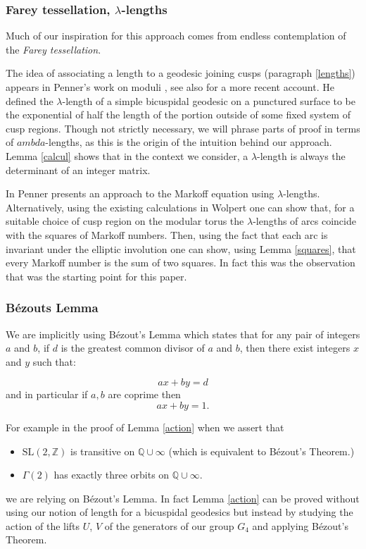 \documentclass[14pt,a4paper]{amsart}
\def\KK{G_4}
\def\ZZ{\mathbb{Z}}
\def\QQ{\mathbb{Q}}
\def\sl2{\mathrm{SL}(2, \ZZ)}
\def\g2{\Gamma(2)}
\begin{document}
 \subsubsection{Farey tessellation, $\lambda$-lengths}

 Much of our inspiration for this approach comes from  endless
 contemplation of the \textit{Farey tessellation}.
 
 The idea of associating a length to a geodesic joining cusps
 (paragraph \ref{lengths}) appears in Penner's work on moduli
 \cite{bob},
see also \cite{spring} for a more recent account.
He defined the $\lambda$-length of a simple bicuspidal geodesic 
on a punctured
surface to be the exponential of half the 
length of the portion outside of some fixed
system of cusp regions.
Though not strictly necessary,
we will phrase parts of proof in terms of $ambda$-lengths,
as this is the origin of the  intuition behind our approach. 
Lemma \ref{calcul} shows that in the context we consider,
a $\lambda$-length is always the determinant 
of an integer matrix.

In \cite{bob} Penner presents an approach to the Markoff equation
using $\lambda$-lengths. Alternatively,  using the existing calculations in
Wolpert \cite{saw} one can show that, for a suitable choice of cusp
region on the modular torus  the $\lambda$-lengths of arcs coincide
with the squares of Markoff numbers. Then, using the fact that each
arc is invariant under the elliptic involution one can show, using
Lemma \ref{squares}, that every Markoff number is the sum of two
squares. In fact this was the observation that was the starting
point for this paper.
 
 
 \subsubsection{Bézouts Lemma}
 We are implicitly using  Bézout's Lemma which 
 states that for any pair of integers \(a\) and \(b\), if \(d\) is the greatest common divisor of \(a\) and \(b\), then there exist integers \(x\) and \(y\) such that:

\[
ax + by = d
\]
and in particular if $a,b$ are coprime then
$$ax + by = 1.$$

 For example in the proof of Lemma \ref{action}
 when we assert that
 \begin{itemize}
 \item $\sl2$ is transitive on $\QQ \cup \infty$ (which is equivalent to Bézout's Theorem.)
 \item $\g2$ has exactly three orbits on $\QQ \cup \infty$.
 \end{itemize}
 we are relying on Bézout's Lemma.
In fact Lemma \ref{action} can be proved
 without using our notion of length for a bicuspidal geodesics 
 but  instead by studying the action of 
 the lifts $U$, $V$  of the generators of our group $\KK$  
 and applying Bézout's Theorem.
 
\end{document}
